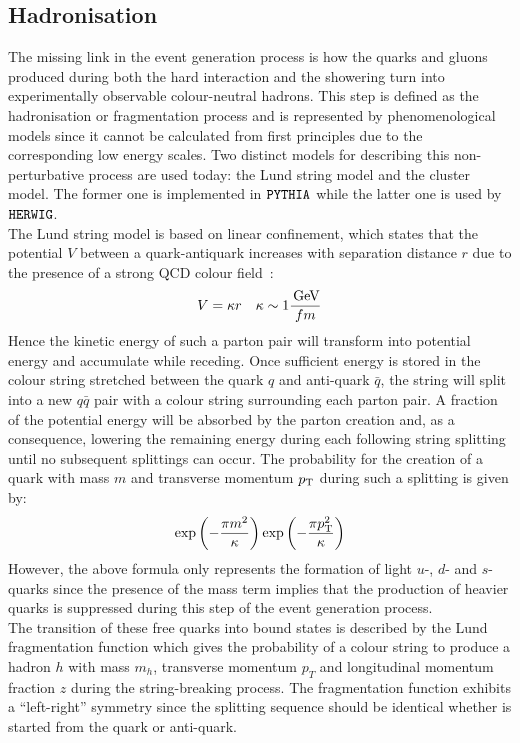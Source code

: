 \subsection{Hadronisation} \label{sec::Hadronisation}
The missing link in the event generation process is how the quarks and gluons produced during both the hard interaction and the showering turn into experimentally observable colour-neutral hadrons. This step is defined as the hadronisation or fragmentation process and is represented by phenomenological models since it cannot be calculated from first principles due to the corresponding low energy scales.
Two distinct models for describing this non-perturbative process are used today: the Lund string model and the cluster model. The former one is implemented in $\texttt{PYTHIA}$ while the latter one is used by $\texttt{HERWIG}$.
\\
The Lund string model is based on linear confinement, which states that the potential $V$ between a quark-antiquark increases with separation distance $r$ due to the presence of a strong QCD colour field~\cite{Lund}: %
\begin{equation}\label{eq::VQCD}
 V = \kappa r ~~~ \kappa \sim 1 \dfrac{\, \mathrm{GeV}}{fm}
\end{equation}
Hence the kinetic energy of such a parton pair will transform into potential energy and accumulate while receding. 
Once sufficient energy is stored in the colour string stretched between the quark $q$ and anti-quark $\bar{q}$, the string will split into a new $q\bar{q}$ pair with a colour string surrounding each parton pair.
A fraction of the potential energy will be absorbed by the parton creation and, as a consequence, lowering the remaining energy during each following string splitting until no subsequent splittings can occur.
The probability for the creation of a quark with mass $m$ and transverse momentum $p_{\rm T}$ during such a splitting is given by:
\begin{equation}\label{eq::mBot}
 \exp \left( -\frac{\pi m^{2}}{\kappa} \right) \exp \left(-\frac{\pi p_{\rm T}^{2}}{\kappa} \right)
\end{equation}
However, the above formula only represents the formation of light $u$-, $d$- and $s$-quarks since the presence of the mass term implies that the production of heavier quarks is suppressed during this step of the event generation process. 
\\
The transition of these free quarks into bound states is described by the Lund fragmentation function which gives the probability of a colour string to produce a hadron $h$ with mass $m_{h}$, transverse momentum $p_{T}$ and longitudinal momentum fraction $z$ during the string-breaking process. The fragmentation function exhibits a ``left-right'' symmetry since the splitting sequence should be identical whether is started from the quark or anti-quark.
